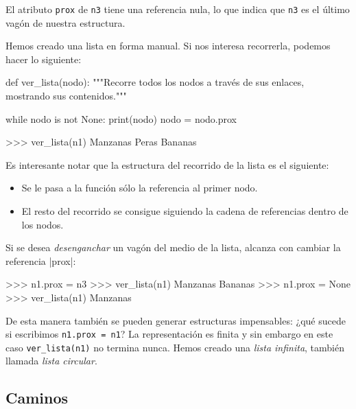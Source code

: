 El atributo \lstinline!prox! de \lstinline!n3! tiene una referencia nula,
lo que indica que \lstinline!n3! es el último vagón de nuestra estructura.

Hemos creado una lista en forma manual. Si nos interesa recorrerla, podemos
hacer lo siguiente:

\begin{codigo-python-sn}
def ver_lista(nodo):
    """Recorre todos los nodos a través de sus enlaces,
       mostrando sus contenidos."""

    while nodo is not None:
        print(nodo)
        nodo = nodo.prox
\end{codigo-python-sn}

\begin{codigo-python-sn}
>>> ver_lista(n1)
Manzanas
Peras
Bananas
\end{codigo-python-sn}

Es interesante notar que la estructura del recorrido de la lista es el
siguiente:

\begin{itemize}
\item Se le pasa a la función sólo la referencia al primer nodo.

\item El resto del recorrido se consigue siguiendo la cadena de
referencias dentro de los nodos.
\end{itemize}

Si se desea \emph{desenganchar} un vagón del medio de la lista, alcanza con
cambiar la referencia |prox|:

\begin{codigo-python-sn}
>>> n1.prox = n3
>>> ver_lista(n1)
Manzanas
Bananas
>>> n1.prox = None
>>> ver_lista(n1)
Manzanas
\end{codigo-python-sn}

De esta manera también se pueden generar estructuras impensables:
¿qué sucede si escribimos \lstinline!n1.prox = n1!? La representación es finita
y sin embargo en este caso \lstinline!ver_lista(n1)! no termina nunca. Hemos
creado una \emph{lista infinita}, también llamada \emph{lista circular}.


\subsection{Caminos}

